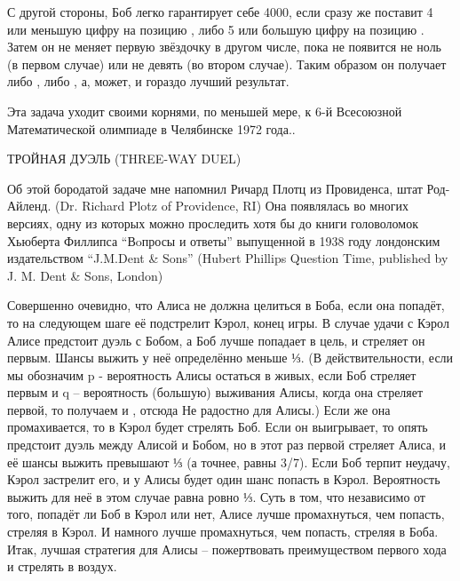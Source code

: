    С другой стороны, Боб легко гарантирует себе 4000, если сразу же поставит 4 или меньшую цифру на позицию , либо 5 или большую цифру на позицию . Затем он не меняет первую звёздочку в другом числе, пока не появится не ноль (в первом случае) или не девять (во втором случае). Таким образом он получает либо , либо , а, может, и гораздо лучший результат.


   Эта задача уходит своими корнями, по меньшей мере, к 6-й Всесоюзной Математической олимпиаде в Челябинске  1972 года..


 ТРОЙНАЯ ДУЭЛЬ (THREE-WAY DUEL)
 
  Об этой бородатой задаче  мне напомнил  Ричард Плотц из Провиденса, штат Род-Айленд. (Dr. Richard Plotz of Providence, RI) Она появлялась во многих версиях, одну из которых можно проследить хотя бы до книги головоломок Хьюберта Филлипса “Вoпросы и ответы”   выпущенной в 1938 году лондонским издательством “J.M.Dent & Sons” (Hubert Phillips Question Time, published by J. M. Dent & Sons, London)


  Совершенно очевидно, что Алиса не должна целиться в Боба, если она попадёт, то на следующем шаге её подстрелит Кэрол, конец игры.
   В случае удачи с Кэрол Алисе предстоит дуэль с Бобом,  а Боб лучше попадает в цель, и стреляет он первым. Шансы выжить у неё определённо меньше ⅓.
  (В действительности, если мы обозначим p - вероятность Алисы остаться в живых, если Боб стреляет первым и q -- вероятность (большую) выживания Алисы, когда она стреляет первой, то получаем  и , отсюда  Не радостно для Алисы.)
  Если же она промахивается, то в Кэрол будет стрелять Боб. Если он выигрывает, то опять предстоит дуэль между Алисой и Бобом, но в этот раз первой стреляет Алиса, и её шансы выжить превышают ⅓ (а точнее, равны 3/7).
  Если Боб терпит неудачу, Кэрол застрелит его, и  у Алисы будет один шанс попасть в Кэрол. Вероятность выжить для неё в этом случае равна ровно ⅓.
  Суть в том, что независимо от того, попадёт ли Боб в Кэрол или нет, Алисе лучше промахнуться, чем попасть, стреляя в Кэрол. И намного лучше промахнуться, чем попасть, стреляя в Боба.
  Итак, лучшая стратегия для Алисы -- пожертвовать преимуществом первого хода и стрелять в воздух.
